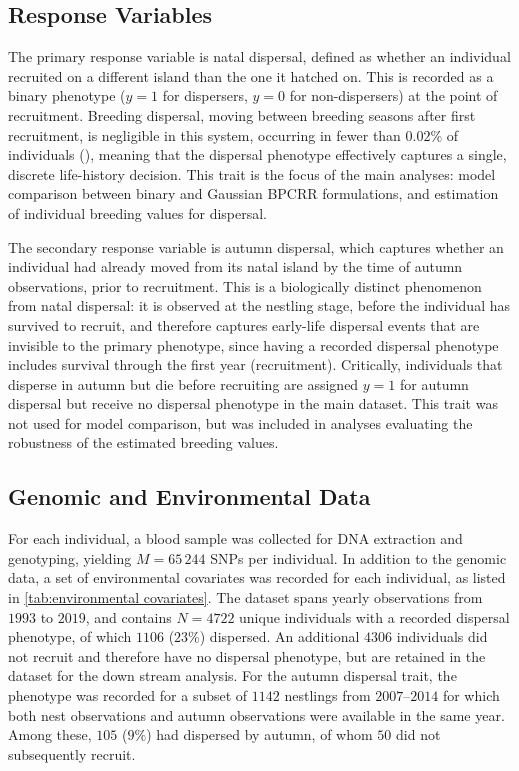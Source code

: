 \subsection{Response Variables}

The primary response variable is natal dispersal, defined as whether an individual recruited on a different island than the one it hatched on. This is recorded as a binary phenotype ($y = 1$ for dispersers, $y = 0$ for non-dispersers) at the point of recruitment. Breeding dispersal, moving between breeding seasons after first recruitment, is negligible in this system, occurring in fewer than $0.02\%$ of individuals (\cite{saatoglu_genetic_2024}), meaning that the dispersal phenotype effectively captures a single, discrete life-history decision. This trait is the focus of the main analyses: model comparison between binary and Gaussian BPCRR formulations, and estimation of individual breeding values for dispersal.

The secondary response variable is autumn dispersal, which captures whether an individual had already moved from its natal island by the time of autumn observations, prior to recruitment. This is a biologically distinct phenomenon from natal dispersal: it is observed at the nestling stage, before the individual has survived to recruit, and therefore captures early-life dispersal events that are invisible to the primary phenotype, since having a recorded dispersal phenotype includes survival through the first year (recruitment). Critically, individuals that disperse in autumn but die before recruiting are assigned $y = 1$ for autumn dispersal but receive no dispersal phenotype in the main dataset. This trait was not used for model comparison, but was included in analyses evaluating the robustness of the estimated breeding values.

\subsection{Genomic and Environmental Data}

For each individual, a blood sample was collected for DNA extraction and genotyping, yielding $M = 65\,244$ SNPs per individual. In addition to the genomic data, a set of environmental covariates was recorded for each individual, as listed in \autoref{tab:environmental covariates}. The dataset spans yearly observations from $1993$ to $2019$, and contains $N = 4722$ unique individuals with a recorded dispersal phenotype, of which $1106$ ($23\%$) dispersed. An additional $4306$ individuals did not recruit and therefore have no dispersal phenotype, but are retained in the dataset for the down stream analysis. For the autumn dispersal trait, the phenotype was recorded for a subset of $1142$ nestlings from $2007$--$2014$ for which both nest observations and autumn observations were available in the same year. Among these, $105$ ($9\%$) had dispersed by autumn, of 
whom $50$ did not subsequently recruit.

